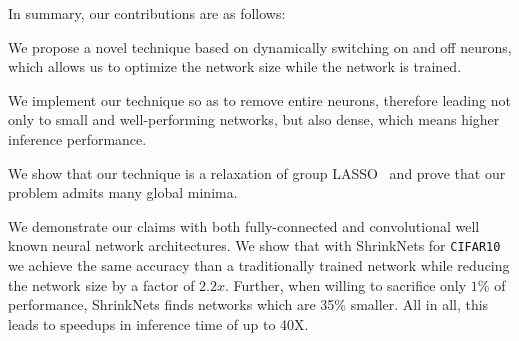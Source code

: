 In summary, our contributions are as follows: 

\begin{compactenum}

\item We propose a novel technique based on dynamically switching on and off neurons, 
which allows us to optimize the network size while the network is trained. 

\item We implement our technique so as to remove entire neurons, therefore
leading not only to small and well-performing networks, but also dense, which
means higher inference performance.


\item We show that our technique is a relaxation of group LASSO~\cite{Yuan2006}
and prove that our problem admits many global minima.

\item We demonstrate our claims with both fully-connected and convolutional well
known neural network architectures. We show that with ShrinkNets for
\texttt{CIFAR10} we achieve the same accuracy than a traditionally trained
network while reducing the network size by a factor of $2.2x$. Further, when
willing to sacrifice only $1$\% of performance, ShrinkNets finds networks which
are 35\% smaller. All in all, this leads to speedups in inference time of up to
40X. 


%
%

\end{compactenum}



